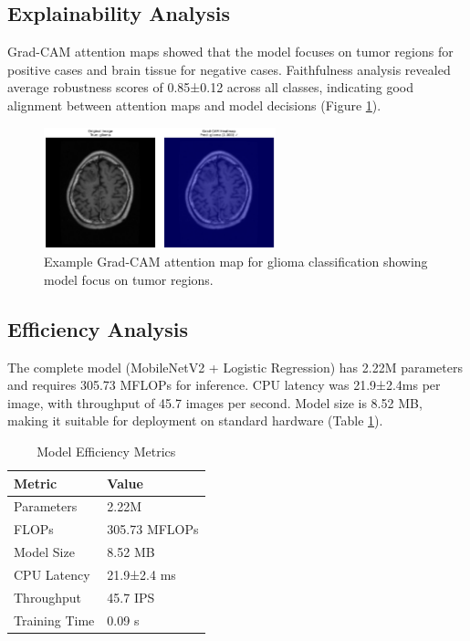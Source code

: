 \documentclass[11pt]{article}
\begin{document}
\subsection{Explainability Analysis}

Grad-CAM attention maps showed that the model focuses on tumor regions for positive cases and brain tissue for negative cases. Faithfulness analysis revealed average robustness scores of 0.85±0.12 across all classes, indicating good alignment between attention maps and model decisions (Figure \ref{fig:xai}).

\begin{figure}[H]
\centering
\includegraphics[width=0.6\textwidth]{figs_paper/Figure4_XAI_Glioma_Example.png}
\caption{Example Grad-CAM attention map for glioma classification showing model focus on tumor regions.}
\label{fig:xai}
\end{figure}

\subsection{Efficiency Analysis}

The complete model (MobileNetV2 + Logistic Regression) has 2.22M parameters and requires 305.73 MFLOPs for inference. CPU latency was 21.9±2.4ms per image, with throughput of 45.7 images per second. Model size is 8.52 MB, making it suitable for deployment on standard hardware (Table \ref{tab:efficiency}).

\begin{table}[H]
\centering
\caption{Model Efficiency Metrics}
\label{tab:efficiency}
\begin{tabular}{@{}ll@{}}
\toprule
\textbf{Metric} & \textbf{Value} \\
\midrule
Parameters & 2.22M \\
FLOPs & 305.73 MFLOPs \\
Model Size & 8.52 MB \\
CPU Latency & 21.9±2.4 ms \\
Throughput & 45.7 IPS \\
Training Time & 0.09 s \\
\bottomrule
\end{tabular}
\end{table}
\end{document}
